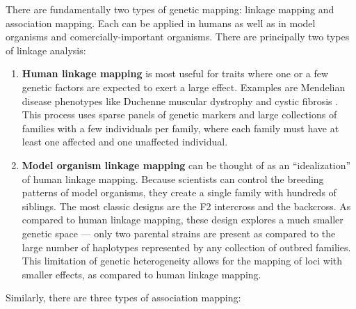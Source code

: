 There are fundamentally two types of genetic mapping: linkage mapping and association mapping. Each can be applied in humans as well as in model organisms and comercially-important organisms.
There are principally two types of linkage analysis:
\begin{enumerate}
	\item \textbf{Human linkage mapping} is most useful for traits where one or a few genetic factors are expected to exert a large effect.
	Examples are Mendelian disease phenotypes like Duchenne muscular dystrophy \citep{Brown1985,Murray1982} and cystic fibrosis \citep{Tsui1985,Wainwright1985,White1985}.
	This process uses sparse panels of genetic markers and large collections of families with a few individuals per family, where each family must have at least one affected and one unaffected individual.
	\item \textbf{Model organism linkage mapping} can be thought of as an ``idealization'' of human linkage mapping.
	Because scientists can control the breeding patterns of model organisms, they create a single family with hundreds of siblings.
	The most classic designs are the F2 intercross and the backcross.
	As compared to human linkage mapping, these design explores a much smaller genetic space --- only two parental strains are present as compared to the large number of haplotypes represented by any collection of outbred families.
	This limitation of genetic heterogeneity allows for the mapping of loci with smaller effects, as compared to human linkage mapping.
\end{enumerate}
Similarly, there are three types of association mapping:
